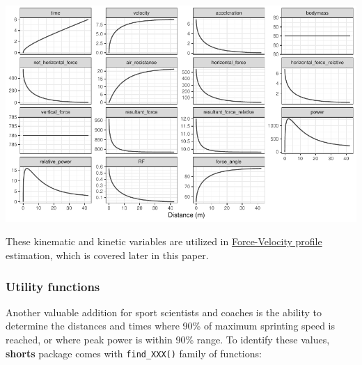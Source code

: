 \documentclass[fleqn,10pt,lineno]{wlpeerj} %
\begin{document}
\begin{center}\includegraphics[width=1\linewidth]{paper_files/figure-latex/unnamed-chunk-9-1} \end{center}

These kinematic and kinetic variables are utilized in \protect\hyperlink{force-velocity-profile}{Force-Velocity profile} estimation, which is covered later in this paper.

\hypertarget{utility-functions}{%
\subsubsection{Utility functions}\label{utility-functions}}

Another valuable addition for sport scientists and coaches is the ability to determine the distances and times where 90\% of maximum sprinting speed is reached, or where peak power is within 90\% range. To identify these values, \textbf{shorts} package comes with \texttt{find\_XXX()} family of functions:
\end{document}

